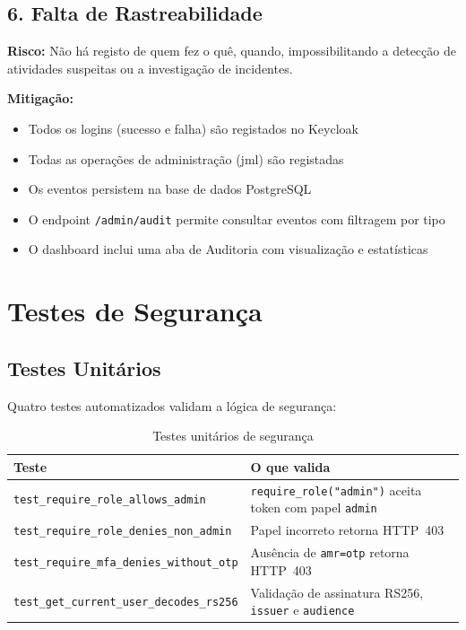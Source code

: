 \subsection{6. Falta de Rastreabilidade}

\textbf{Risco:} Não há registo de quem fez o quê, quando, impossibilitando a detecção de atividades suspeitas ou a investigação de incidentes.

\textbf{Mitigação:}
\begin{itemize}
  \item Todos os logins (sucesso e falha) são registados no Keycloak
  \item Todas as operações de administração (\gls{jml}) são registadas
  \item Os eventos persistem na base de dados PostgreSQL
  \item O endpoint \texttt{/admin/audit} permite consultar eventos com filtragem por tipo
  \item O dashboard inclui uma aba de Auditoria com visualização e estatísticas
\end{itemize}

\section{Testes de Segurança}

\subsection{Testes Unitários}

Quatro testes automatizados validam a lógica de segurança:

\begin{table}[h!]
\centering
\caption{Testes unitários de segurança}
\label{tab:testes}
\begin{tabularx}{\textwidth}{|l|X|}
\hline
\textbf{Teste} & \textbf{O que valida} \\ \hline
\texttt{test\_require\_role\_allows\_admin} & \texttt{require\_role("admin")} aceita token com papel \texttt{admin} \\ \hline
\texttt{test\_require\_role\_denies\_non\_admin} & Papel incorreto retorna HTTP~403 \\ \hline
\texttt{test\_require\_mfa\_denies\_without\_otp} & Ausência de \texttt{amr=otp} retorna HTTP~403 \\ \hline
\texttt{test\_get\_current\_user\_decodes\_rs256} & Validação de assinatura RS256, \texttt{issuer} e \texttt{audience} \\ \hline
\end{tabularx}
\end{table}

